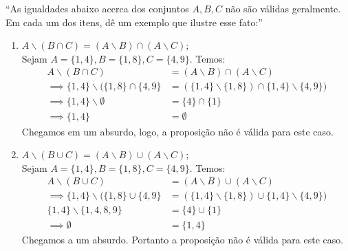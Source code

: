 \enquote{As igualdades abaixo acerca dos conjuntos $A, B, C$ não são válidas geralmente. Em cada um dos itens, dê um exemplo que ilustre esse fato:}
    \begin{enumerate}
        \item $A \backslash (B \cap C) = (A \backslash B) \cap (A \backslash C)$; \\
            Sejam $A = \{1, 4\}, B = \{1, 8\}, C = \{4, 9\}$. Temos:
            \begin{align*}
                A \backslash (B \cap C) &= (A \backslash B) \cap (A \backslash C) \\ \implies
                \{1, 4\} \backslash (\{1, 8\} \cap \{4, 9\} &= (\{1,4\} \backslash \{1, 8\}) \cap \{1,4\} \backslash \{4, 9\}) \\ 
                \implies
                \{1, 4\} \backslash \emptyset &= \{4\} \cap \{1\} \\ 
                \implies 
                \{1, 4\} &= \emptyset
            \end{align*}
            Chegamos em um absurdo, logo, a proposição não é válida para este caso.
        \item $A \backslash (B \cup C) = (A \backslash B) \cup (A \backslash C)$; \\
        Sejam $A = \{1, 4\}, B = \{1, 8\}, C = \{4, 9\}$. Temos:
        \begin{align*}
            A \backslash (B \cup C) &= (A \backslash B) \cup (A \backslash C) \\
            \implies 
            \{1, 4\} \backslash (\{1, 8\} \cup \{4, 9\} &= (\{1,4\} \backslash \{1, 8\}) \cup \{1,4\} \backslash \{4, 9\}) \\ 
            \{1, 4\} \backslash \{1, 4, 8, 9 \} &= \{4\} \cup \{1\} \\ \implies
            \emptyset &= \{1, 4\}
        \end{align*}
        Chegamos a um absurdo. Portanto a proposição não é válida para este caso.
    \end{enumerate}